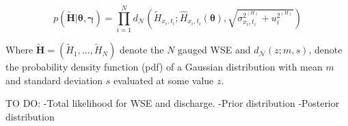 \documentclass[12pt]{article}
\begin{document}
\begin{equation}
    p(\boldsymbol{\tilde{H}} | \boldsymbol{\theta},\boldsymbol{\gamma}) = \prod_{i=1}^{N} d_\mathcal{N}\left(\tilde{H}_{x_i,t_i} ; \hat{H}_{x_i,t_i}(\boldsymbol{\theta}), \sqrt{\sigma^{2^{(H)}}_{x_i,t_i} + u_i^{2^{(H)}}}\right)
\end{equation}

Where \(\boldsymbol{\tilde{H}} = (\tilde{H}_1,\ldots,\tilde{H}_N)\) denote the \(N\) gauged WSE and \(d_\mathcal{N}(z;m,s)\), denote the probability density function (pdf) of a Gaussian distribution with mean \(m\) and standard deviation \(s\) evaluated at some value \(z\).


TO DO:
-Total likelihood for WSE and discharge.
-Prior distribution 
-Posterior distribution
\end{document}
